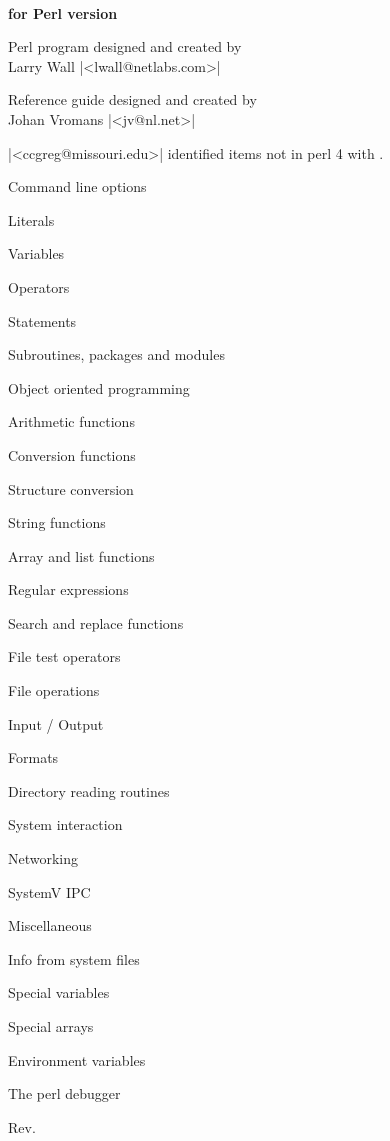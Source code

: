 \def\revision{0}



\begin{titlepage}
\hbox{ }
\end{titlepage}

\begin{titlepage}

{\bf for Perl version \perlrev}

\bigskip
Perl program designed and created by \\
Larry Wall |<lwall@netlabs.com>|

\bigskip
Reference guide designed and created by \\
Johan Vromans |<jv@nl.net>|

\bigskip
|<ccgreg@missouri.edu>| identified items not in perl 4 with \ddag .

\bigskip
{}

\begin{list}{\thexx.}
{\setlength{\topsep}{0pt plus 1pt}
 \setlength{\itemsep}{0pt plus 1pt}
 \setlength{\parsep}{0pt plus 1pt}
 }
\item Command line options
\item Literals
\item Variables
\item Operators
\item Statements
\item Subroutines, packages and modules
\item Object oriented programming
\item Arithmetic functions
\item Conversion functions
\item Structure conversion
\item String functions
\item Array and list functions
\item Regular expressions
\item Search and replace functions
\item File test operators
\item File operations
\item Input / Output
\item Formats
\item Directory reading routines
\item System interaction
\item Networking
\item SystemV IPC
\item Miscellaneous
\item Info from system files
\item Special variables
\item Special arrays
\item Environment variables
\item The perl debugger

\end{list}
\bigskip
{\small {Rev. }}
\end{titlepage}
\clearpage
\setcounter{page}{2}

